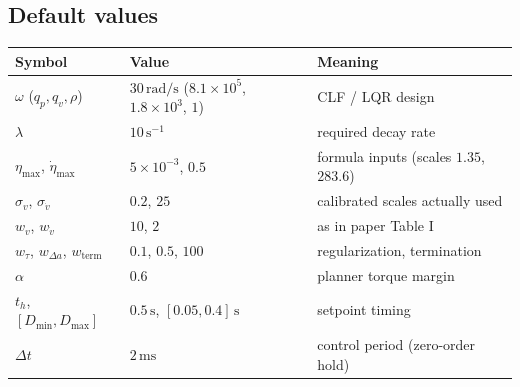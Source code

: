 \subsection*{Default values}
\begin{center}
\begin{tabular}{lll}
\hline
Symbol & Value & Meaning \\
\hline
$\omega$ ($q_p, q_v, \rho$) & $30\,\mathrm{rad/s}$ ($8.1\times10^5$, $1.8\times10^3$, $1$) & CLF / LQR design \\
$\lambda$ & $10\,\mathrm{s^{-1}}$ & required decay rate \\
$\eta_{\max}$, $\dot\eta_{\max}$ & $5\times10^{-3}$, $0.5$ & formula inputs (scales $1.35$, $283.6$) \\
$\sigma_v$, $\sigma_{\dot v}$ & $0.2$, $25$ & calibrated scales actually used \\
$w_v$, $w_{\dot v}$ & $10$, $2$ & as in paper Table I \\
$w_\tau$, $w_{\Delta a}$, $w_{\mathrm{term}}$ & $0.1$, $0.5$, $100$ & regularization, termination \\
$\alpha$ & $0.6$ & planner torque margin \\
$t_h$, $[D_{\min}, D_{\max}]$ & $0.5\,\mathrm{s}$, $[0.05, 0.4]\,\mathrm{s}$ & setpoint timing \\
$\Delta t$ & $2\,\mathrm{ms}$ & control period (zero-order hold) \\
\hline
\end{tabular}
\end{center}